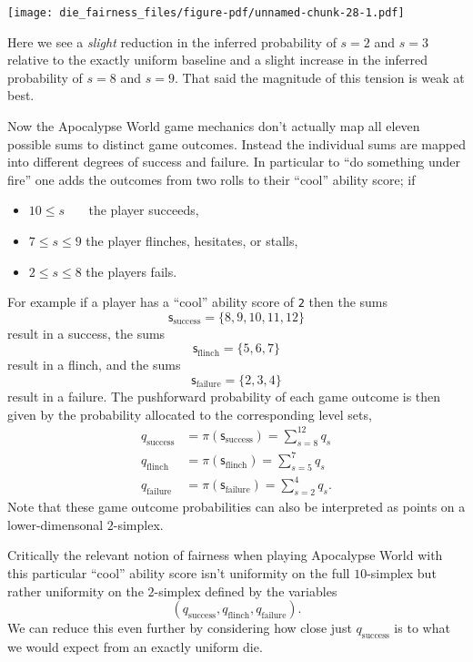 \documentclass[
  letterpaper,
  DIV=11,
  numbers=noendperiod]{scrartcl}
\providecommand{\tightlist}{%
  \setlength{\itemsep}{0pt}\setlength{\parskip}{0pt}}\usepackage{longtable,booktabs,array}
\begin{document}
\texttt{[image: die\_fairness\_files/figure-pdf/unnamed-chunk-28-1.pdf]}

Here we see a \emph{slight} reduction in the inferred probability of
\(s = 2\) and \(s = 3\) relative to the exactly uniform baseline and a
slight increase in the inferred probability of \(s = 8\) and \(s = 9\).
That said the magnitude of this tension is weak at best.

Now the Apocalypse World game mechanics don't actually map all eleven
possible sums to distinct game outcomes. Instead the individual sums are
mapped into different degrees of success and failure. In particular to
``do something under fire'' one adds the outcomes from two rolls to
their ``cool'' ability score; if

\begin{itemize}
\tightlist
\item
  \(10 \le s \quad\;\;\) the player succeeds,
\item
  \(7  \le s \le 9\) the player flinches, hesitates, or stalls,
\item
  \(2  \le s \le 8\) the players fails.
\end{itemize}

For example if a player has a ``cool'' ability score of \texttt{2} then
the sums \[
\mathsf{s}_{\mathrm{success}} = \{ 8, 9, 10, 11, 12 \}
\] result in a success, the sums \[
\mathsf{s}_{\mathrm{flinch}} = \{ 5, 6, 7 \}
\] result in a flinch, and the sums \[
\mathsf{s}_{\mathrm{failure}} = \{ 2, 3, 4 \}
\] result in a failure. The pushforward probability of each game outcome
is then given by the probability allocated to the corresponding level
sets, \begin{align*}
q_{\mathrm{success}}
&=
\pi( \mathsf{s}_{\mathrm{success}} ) = \sum_{s = 8}^{12} q_{s}
\\
q_{\mathrm{flinch}}
&=
\pi( \mathsf{s}_{\mathrm{flinch}} ) = \sum_{s = 5}^{7} q_{s}
\\
q_{\mathrm{failure}}
&=
\pi( \mathsf{s}_{\mathrm{failure}} ) = \sum_{s = 2}^{4} q_{s}.
\end{align*} Note that these game outcome probabilities can also be
interpreted as points on a lower-dimensonal \(2\)-simplex.

Critically the relevant notion of fairness when playing Apocalypse World
with this particular ``cool'' ability score isn't uniformity on the full
\(10\)-simplex but rather uniformity on the \(2\)-simplex defined by the
variables \[
(q_{\mathrm{success}}, q_{\mathrm{flinch}}, q_{\mathrm{failure}}) .
\] We can reduce this even further by considering how close just
\(q_{\mathrm{success}}\) is to what we would expect from an exactly
uniform die.
\end{document}

